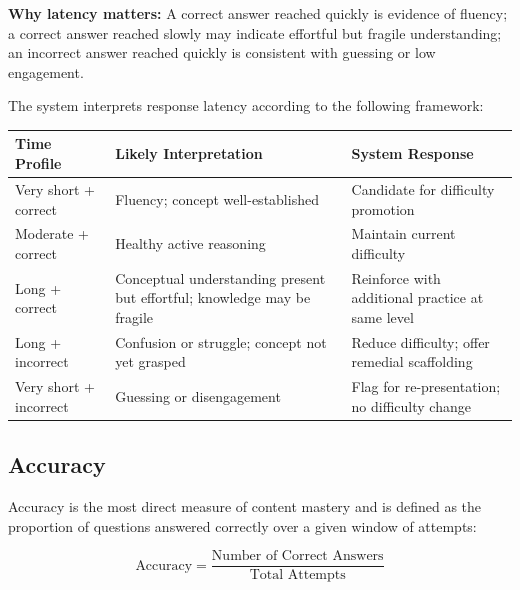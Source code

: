 \documentclass[12pt,a4paper]{article}
\begin{document}
\begin{calloutbox}
\textbf{Why latency matters:}
A correct answer reached quickly is evidence of fluency; a correct answer
reached slowly may indicate effortful but fragile understanding; an incorrect
answer reached quickly is consistent with guessing or low engagement.
\end{calloutbox}

\medskip
The system interprets response latency according to the following framework:

\begin{center}
\begin{tabular}{p{3.2cm} p{4.2cm} p{5cm}}
  \toprule
  \textbf{Time Profile} & \textbf{Likely Interpretation} & \textbf{System Response} \\
  \midrule
  Very short + correct  & Fluency; concept well-established
                        & Candidate for difficulty promotion \\[4pt]
  Moderate + correct    & Healthy active reasoning
                        & Maintain current difficulty \\[4pt]
  Long + correct        & Conceptual understanding present but effortful; knowledge may be fragile
                        & Reinforce with additional practice at same level \\[4pt]
  Long + incorrect      & Confusion or struggle; concept not yet grasped
                        & Reduce difficulty; offer remedial scaffolding \\[4pt]
  Very short + incorrect& Guessing or disengagement
                        & Flag for re-presentation; no difficulty change \\
  \bottomrule
\end{tabular}
\end{center}

\subsection{Accuracy}

Accuracy is the most direct measure of content mastery and is defined as the
proportion of questions answered correctly over a given window of attempts:

\begin{equation}
  \text{Accuracy} = \frac{\text{Number of Correct Answers}}{\text{Total Attempts}}
\end{equation}
\end{document}
